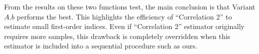 From the results on these two functions test, the main conclusion is that Variant $A.b$ performs the best. This highlights the efficiency of ``Correlation 2'' to estimate small first-order indices. Even if ``Correlation 2'' estimator originally requires more samples, this drawback is completely overridden when this estimator is included into a sequential procedure such as ours.


